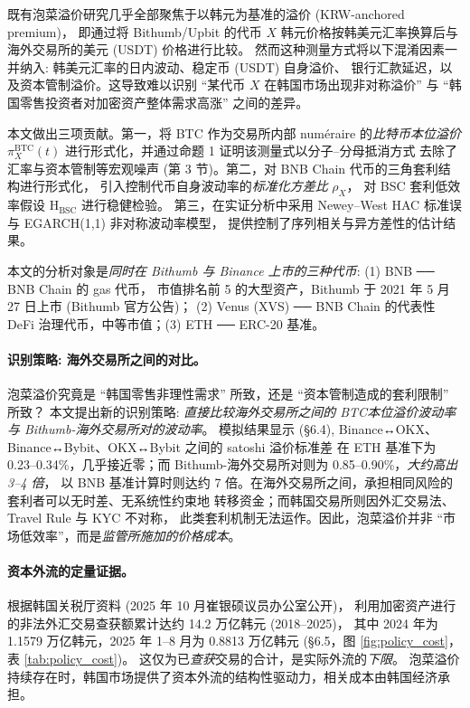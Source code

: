 \documentclass[11pt,a4paper]{article}
\begin{document}
既有泡菜溢价研究几乎全部聚焦于以韩元为基准的溢价 (KRW-anchored premium)，
即通过将 Bithumb/Upbit 的代币 $X$ 韩元价格按韩美元汇率换算后与海外交易所的美元 (USDT) 价格进行比较。
然而这种测量方式将以下混淆因素一并纳入: 韩美元汇率的日内波动、稳定币 (USDT) 自身溢价、
银行汇款延迟，以及资本管制溢价。这导致难以识别
``某代币 $X$ 在韩国市场出现非对称溢价'' 与 ``韩国零售投资者对加密资产整体需求高涨'' 之间的差异。

本文做出三项贡献。第一，将 BTC 作为交易所内部 num\'eraire 的\emph{比特币本位溢价}
$\pi^{\text{BTC}}_X(t)$ 进行形式化，并通过命题 1 证明该测量式以分子--分母抵消方式
去除了汇率与资本管制等宏观噪声 (第 3 节)。第二，对 BNB Chain 代币的三角套利结构进行形式化，
引入控制代币自身波动率的\emph{标准化方差比} $\rho_X$，
对 BSC 套利低效率假设 $\mathrm{H_{BSC}}$ 进行稳健检验。
第三，在实证分析中采用 Newey--West HAC 标准误与 EGARCH(1,1) 非对称波动率模型，
提供控制了序列相关与异方差性的估计结果。

本文的分析对象是\emph{同时在 Bithumb 与 Binance 上市的三种代币}: (1) BNB ── BNB Chain 的 gas 代币，
市值排名前 5 的大型资产，Bithumb 于 2021 年 5 月 27 日上市 (Bithumb 官方公告)；
(2) Venus (XVS) ── BNB Chain 的代表性 DeFi 治理代币，中等市值；(3) ETH ── ERC-20 基准。

\paragraph{识别策略: 海外交易所之间的对比。}
泡菜溢价究竟是 ``韩国零售非理性需求'' 所致，还是 ``资本管制造成的套利限制'' 所致？
本文提出新的识别策略: \emph{直接比较海外交易所之间的 BTC本位溢价波动率与 Bithumb-海外交易所对的波动率}。
模拟结果显示 (\S 6.4), Binance↔OKX、Binance↔Bybit、OKX↔Bybit 之间的 satoshi 溢价标准差
在 ETH 基准下为 0.23--0.34\%，几乎接近零；而 Bithumb-海外交易所对则为 0.85--0.90\%，\emph{大约高出 3--4 倍}，
以 BNB 基准计算时则达约 7 倍。在海外交易所之间，承担相同风险的套利者可以无时差、无系统性约束地
转移资金；而韩国交易所则因外汇交易法、Travel Rule 与 KYC 不对称，
此类套利机制无法运作。因此，泡菜溢价并非 ``市场低效率''，而是\emph{监管所施加的价格成本}。

\paragraph{资本外流的定量证据。}
根据韩国关税厅资料 (2025 年 10 月崔银硕议员办公室公开)，
利用加密资产进行的非法外汇交易查获额累计达约 14.2 万亿韩元 (2018--2025)，
其中 2024 年为 1.1579 万亿韩元，2025 年 1--8 月为 0.8813 万亿韩元
(\S 6.5，图 \ref{fig:policy_cost}，表 \ref{tab:policy_cost})。
这仅为已\emph{查获}交易的合计，是实际外流的\emph{下限}。
泡菜溢价持续存在时，韩国市场提供了资本外流的结构性驱动力，相关成本由韩国经济承担。
\end{document}
